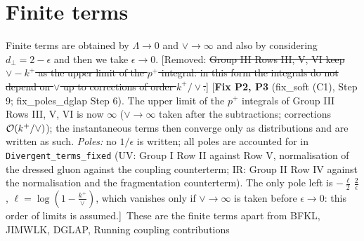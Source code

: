\documentclass[9pt]{article}
\numberwithin{equation}{section}
\begin{document}
\section{Finite terms}
Finite terms are obtained by $\Lambda \to 0$ and $\vee\to \infty $ and also by considering $d_{\perp} = 2-\epsilon$ and then we take $\epsilon \to 0$. {\color{orange}[Removed: \sout{Group III Rows III, V, VI keep $\vee-k^{+}$ as the upper limit of the $p^{+}$ integral: in this form the integrals do not depend on $\vee$ up to corrections of order $k^{+}/\vee$.}]} {\color{red}[\textbf{Fix P2, P3} (fix\_soft (C1), Step 9; fix\_poles\_dglap Step 6). The upper limit of the $p^{+}$ integrals of Group III Rows III, V, VI is now $\infty$ ($\vee\to\infty$ taken after the subtractions; corrections ${\cal O}(k^{+}/\vee)$); the instantaneous terms then converge only as distributions and are written as such. \emph{Poles:} no $1/\epsilon$ is written; all poles are accounted for in \texttt{Divergent\_terms\_fixed} (UV: Group I Row II against Row V, normalisation of the dressed gluon against the coupling counterterm; IR: Group II Row IV against the normalisation and the fragmentation counterterm). The only pole left is $-\frac{\ell}{2}\,\frac{2}{\epsilon}$, $\ell=\log(1-\frac{k^{+}}{\vee})$, which vanishes only if $\vee\to\infty$ is taken before $\epsilon\to0$: this order of limits is assumed.]}\ 
These are the finite terms apart from BFKL, JIMWLK, DGLAP, Running coupling contributions
\end{document}
